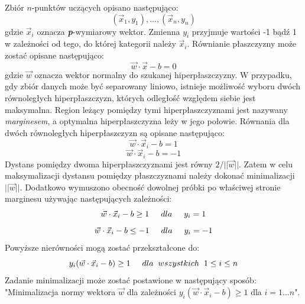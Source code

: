 Zbiór $n$-punktów uczących opisano następująco:
\begin{equation}
(\vec{x}_1,y_1), ..., (\vec{x}_n,y_n)
\end{equation}
gdzie $\vec{x}_i$ oznacza \textit{\textbf{p}}-wymiarowy wektor. Zmienna $y_i$ przyjmuje wartości -1 bądź 1 w zależności od tego, do której kategorii należy $\vec{x}_i$. Równianie płaszczyzny może zostać opisane następująco:
\begin{equation}
\vec{w}\cdot \vec{x} - b = 0
\end{equation}
gdzie $\vec{w}$ oznacza wektor normalny do szukanej hiperpłaszczyzny. W przypadku, gdy zbiór danych może być separowany liniowo, istnieje możliwość wyboru dwóch równoległych hiperpłaszczyzn, których odległość względem siebie jest maksymalna. Region leżący pomiędzy tymi hiperpłaszczyznami jest nazywany \textit{marginesem}, a optymalna hiperpłaszczyzna leży w jego połowie. Równania dla dwóch równoległych hiperpłaszczyzn są opisane następująco:
\begin{equation}
\vec{w}\cdot \vec{x}_i - b = 1
\end{equation}
\begin{equation}
\vec{w}\cdot \vec{x}_i - b = -1
\end{equation}
Dystans pomiędzy dwoma hiperpłaszczyznami jest równy $2 /||\vec{w}||$. Zatem w celu maksymalizacji dystansu pomiędzy płaszczyznami należy dokonać minimalizacji $||\vec{w}||$. Dodatkowo wymuszono obecność dowolnej próbki po właściwej stronie marginesu używając następujących zależności:
\begin{equation}
\vec{w}\cdot \vec{x}_i - b \geq 1 \hspace{0.5cm} dla \hspace{0.5cm} y_i = 1 
\end{equation}
\begin{equation}
\vec{w}\cdot \vec{x}_i - b \leq -1 \hspace{0.5cm} dla \hspace{0.5cm} y_i = -1
\end{equation}
Powyższe nierówności mogą zostać przekształcone do:
\begin{equation}
y_i(\vec{w}\cdot \vec{x}_i - b) \geq 1 \hspace{0.5cm} dla \hspace{0.2cm} wszystkich \hspace{0.2cm} 1 \leq i \leq n
\end{equation}
Zadanie minimalizacji może zostać postawione w następujący sposób:
"Minimalizacja normy wektora $\vec{w}$ dla zależności $y_i(\vec{w}\cdot \vec{x}_i - b) \geq 1$ dla $i=1 \ldots n$".
